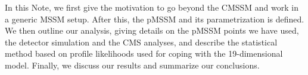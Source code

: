 In this Note, we first give the motivation to go beyond the CMSSM and work in 
a generic MSSM setup. After this, the pMSSM and its parametrization is defined. 
We then outline our analysis, giving details on the pMSSM points we have used, 
the detector simulation and the CMS analyses, and describe the statistical method based on 
profile likelihoods used for coping with the 19-dimensional model. Finally, we discuss our results and summarize our conclusions.

